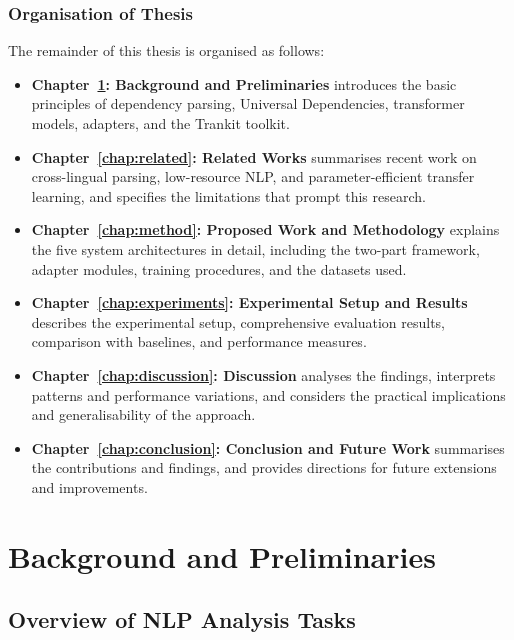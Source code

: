 \documentclass[12pt,a4paper,oneside]{report}
\begin{document}
\subsection{Organisation of Thesis}

The remainder of this thesis is organised as follows:
\begin{itemize}
  \item \textbf{Chapter~\ref{chap:background}: Background and Preliminaries}
        introduces the basic principles of dependency parsing, Universal Dependencies,
        transformer models, adapters, and the Trankit toolkit.
  \item \textbf{Chapter~\ref{chap:related}: Related Works} summarises recent work
        on cross-lingual parsing, low-resource NLP, and parameter-efficient transfer
        learning, and specifies the limitations that prompt this research.
  \item \textbf{Chapter~\ref{chap:method}: Proposed Work and Methodology} explains
        the five system architectures in detail, including the two-part
        framework, adapter modules, training procedures, and the datasets used.
  \item \textbf{Chapter~\ref{chap:experiments}: Experimental Setup and Results}
        describes the experimental setup, comprehensive evaluation results,
        comparison with baselines, and performance measures.
  \item \textbf{Chapter~\ref{chap:discussion}: Discussion} analyses the findings,
        interprets patterns and performance variations, and considers the practical
        implications and generalisability of the approach.
  \item \textbf{Chapter~\ref{chap:conclusion}: Conclusion and Future Work}
        summarises the contributions and findings, and provides directions for future
        extensions and improvements.
\end{itemize}


\chapter{Background and Preliminaries}
\label{chap:background}

\section{Overview of NLP Analysis Tasks}
\end{document}
